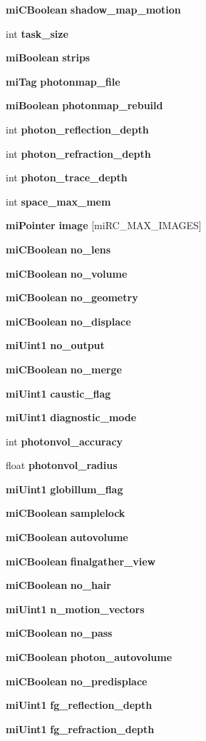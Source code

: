 \begin{CompactItemize}
{\bf mi\-CBoolean} {\bf shadow\_\-map\_\-motion}
\item 
int {\bf task\_\-size}
\item 
{\bf mi\-Boolean} {\bf strips}
\item 
{\bf mi\-Tag} {\bf photonmap\_\-file}
\item 
{\bf mi\-Boolean} {\bf photonmap\_\-rebuild}
\item 
int {\bf photon\_\-reflection\_\-depth}
\item 
int {\bf photon\_\-refraction\_\-depth}
\item 
int {\bf photon\_\-trace\_\-depth}
\item 
int {\bf space\_\-max\_\-mem}
\item 
{\bf mi\-Pointer} {\bf image} [mi\-RC\_\-MAX\_\-IMAGES]
\item 
{\bf mi\-CBoolean} {\bf no\_\-lens}
\item 
{\bf mi\-CBoolean} {\bf no\_\-volume}
\item 
{\bf mi\-CBoolean} {\bf no\_\-geometry}
\item 
{\bf mi\-CBoolean} {\bf no\_\-displace}
\item 
{\bf mi\-Uint1} {\bf no\_\-output}
\item 
{\bf mi\-CBoolean} {\bf no\_\-merge}
\item 
{\bf mi\-Uint1} {\bf caustic\_\-flag}
\item 
{\bf mi\-Uint1} {\bf diagnostic\_\-mode}
\item 
int {\bf photonvol\_\-accuracy}
\item 
float {\bf photonvol\_\-radius}
\item 
{\bf mi\-Uint1} {\bf globillum\_\-flag}
\item 
{\bf mi\-CBoolean} {\bf samplelock}
\item 
{\bf mi\-CBoolean} {\bf autovolume}
\item 
{\bf mi\-CBoolean} {\bf finalgather\_\-view}
\item 
{\bf mi\-CBoolean} {\bf no\_\-hair}
\item 
{\bf mi\-Uint1} {\bf n\_\-motion\_\-vectors}
\item 
{\bf mi\-CBoolean} {\bf no\_\-pass}
\item 
{\bf mi\-CBoolean} {\bf photon\_\-autovolume}
\item 
{\bf mi\-CBoolean} {\bf no\_\-predisplace}
\item 
{\bf mi\-Uint1} {\bf fg\_\-reflection\_\-depth}
\item 
{\bf mi\-Uint1} {\bf fg\_\-refraction\_\-depth}

\end{CompactItemize}
